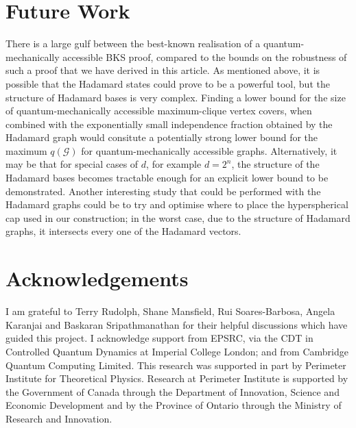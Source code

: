 \documentclass{amsart}
\theoremstyle{definition}
\begin{document}
\section{Future Work}
There is a large gulf between the best-known realisation of a quantum-mechanically accessible BKS proof, compared to the bounds on the robustness of such a proof that we have derived in this article. As mentioned above, it is possible that the Hadamard states could prove to be a powerful tool, but the structure of Hadamard bases is very complex. Finding a lower bound for the size of quantum-mechanically accessible maximum-clique vertex covers, when combined with the exponentially small independence fraction obtained by the Hadamard graph would consitute a potentially strong lower bound for the maximum $q(\mathcal{G})$ for quantum-mechanically accessible graphs. Alternatively, it may be that for special cases of $d$, for example $d=2^n$, the structure of the Hadamard bases becomes tractable enough for an explicit lower bound to be demonstrated. Another interesting study that could be performed with the Hadamard graphs could be to try and optimise where to place the hyperspherical cap used in our construction; in the worst case, due to the structure of Hadamard graphs, it intersects every one of the Hadamard vectors.

\section{Acknowledgements}
I am grateful to Terry Rudolph, Shane Mansfield, Rui Soares-Barbosa, Angela Karanjai and Baskaran Sripathmanathan for their helpful discussions which have guided this project. I acknowledge support from EPSRC, via the CDT in Controlled Quantum Dynamics at Imperial College London; and from Cambridge Quantum Computing Limited. This research was supported in part by Perimeter Institute for Theoretical Physics. Research at Perimeter Institute is supported by the Government of Canada through the Department of Innovation, Science and Economic Development and by the Province of Ontario through the Ministry of Research and Innovation.

{}

\end{document}
